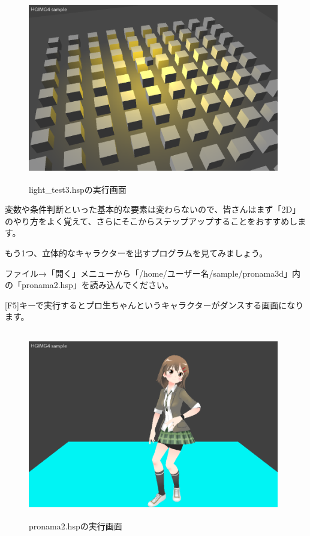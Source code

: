 \begin{figure}[H]
    \begin{center}
      \includegraphics[keepaspectratio,width=10.971cm,height=8.229cm]{text04-img/s_lighttest3.png}
      \caption{light\_test3.hspの実行画面}
    \end{center}
    \label{fig:prog_menu}
\end{figure}


変数や条件判断といった基本的な要素は変わらないので、皆さんはまず「2D」のやり方をよく覚えて、さらにそこからステップアップすることをおすすめします。

もう1つ、立体的なキャラクターを出すプログラムを見てみましょう。


ファイル→「開く」メニューから「/home/ユーザー名/sample/pronama3d」内の「pronama2.hsp」を読み込んでください。

[F5]キーで実行するとプロ生ちゃんというキャラクターがダンスする画面になります。


\begin{figure}[H]
    \begin{center}
      \includegraphics[keepaspectratio,width=10.971cm,height=8.229cm]{text04-img/s_pronama2.png}
      \caption{pronama2.hspの実行画面}
    \end{center}
    \label{fig:prog_menu}
\end{figure}

